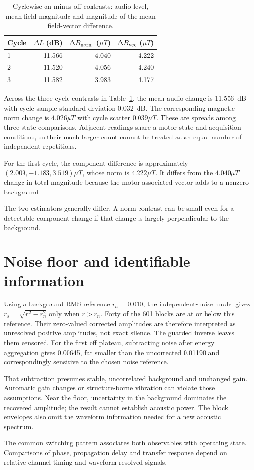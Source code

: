 \begin{table}[t]
\caption{Cyclewise on-minus-off contrasts: audio level, mean field magnitude and magnitude of the mean field-vector difference.}
\label{tab:audio-magnetic-contrasts}
\centering\small
\begin{tabular}{@{}lrrr@{}}
\toprule
Cycle & $\Delta L$ (dB) & $\Delta B_{\rm norm}$ ($\unit{\mu T}$) & $\Delta B_{\rm vec}$ ($\unit{\mu T}$)\\
\midrule
1 & 11.566 & 4.040 & 4.222\\
2 & 11.520 & 4.056 & 4.240\\
3 & 11.582 & 3.983 & 4.177\\
\bottomrule
\end{tabular}
\end{table}

Across the three cycle contrasts in Table~\ref{tab:audio-magnetic-contrasts}, the mean audio change is 11.556~dB with cycle sample standard deviation 0.032~dB. The corresponding magnetic-norm change is $4.026\unit{\mu T}$ with cycle scatter $0.039\unit{\mu T}$. These are spreads among three state comparisons. Adjacent readings share a motor state and acquisition conditions, so their much larger count cannot be treated as an equal number of independent repetitions.

For the first cycle, the component difference is approximately $(2.009,-1.183,3.519)\unit{\mu T}$, whose norm is $4.222\unit{\mu T}$. It differs from the $4.040\unit{\mu T}$ change in total magnitude because the motor-associated vector adds to a nonzero background.

The two estimators generally differ. A norm contrast can be small even for a detectable component change if that change is largely perpendicular to the background.

\section{Noise floor and identifiable information}
Using a background RMS reference $r_n=0.010$, the independent-noise model gives $r_s=\sqrt{r^2-r_n^2}$ only when $r>r_n$. Forty of the 601 blocks are at or below this reference. Their zero-valued corrected amplitudes are therefore interpreted as unresolved positive amplitudes, not exact silence. The guarded inverse leaves them censored. For the first off plateau, subtracting noise after energy aggregation gives 0.00645, far smaller than the uncorrected 0.01190 and correspondingly sensitive to the chosen noise reference.

That subtraction presumes stable, uncorrelated background and unchanged gain. Automatic gain changes or structure-borne vibration can violate those assumptions. Near the floor, uncertainty in the background dominates the recovered amplitude; the result cannot establish acoustic power. The block envelopes also omit the waveform information needed for a new acoustic spectrum.

\newpage
The common switching pattern associates both observables with operating state. Comparisons of phase, propagation delay and transfer response depend on relative channel timing and waveform-resolved signals.
